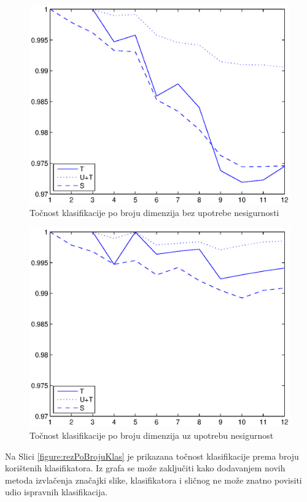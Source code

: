 \documentclass[a4paper,twocolumn,dvipdfm]{article}
\begin{document}
\begin{figure}
\centering
\includegraphics[scale=0.5]{accByDim1.eps}
\caption{Točnost klasifikacije po broju dimenzija bez upotrebe nesigurnosti}
\label{figure:rezPoDim1}
\end{figure}

\begin{figure}
\centering
\includegraphics[scale=0.5]{accByDim2.eps}
\caption{Točnost klasifikacije po broju dimenzija uz upotrebu nesigurnost}
\label{figure:rezPoDim2}
\end{figure}

Na Slici \ref{figure:rezPoBrojuKlas} je prikazana točnost klasifikacije prema
broju korištenih klasifikatora. Iz grafa se može zaključiti kako dodavanjem
novih metoda izvlačenja značajki slike, klasifikatora i sličnog ne može znatno
povisiti udio ispravnih klasifikacija.
\end{document}
